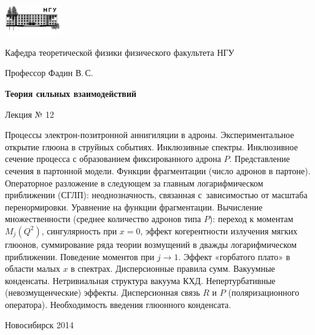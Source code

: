 \documentclass[12pt,pagesize,paper=192mm:108mm]{scrbook}
\begin{document}
\begin{titlepage}
  \vspace*{-1em}
  \begin{center}
    \includegraphics[width=0.18\textwidth]{../NSU-logo}

    Кафедра теоретической физики физического факультета НГУ

    \large
    Профессор Фадин В.\,С.
    \vspace{-0.5em}

    \huge
    \textbf{Теория сильных взаимодействий}
    
    \Large
    Лекция № 12
    \vfill
    
    \normalsize
    \begin{minipage}{0.93\linewidth}
    \footnotesize Процессы электрон-позитронной аннигиляции в
    адроны. Экспериментальное открытие глюона в струйных
    событиях. Инклюзивные спектры. Инклюзивное сечение процесса с
    образованием фиксированного адрона $P$. Представление сечения в
    партонной модели. Функции фрагментации (число адронов в
    партоне). Операторное разложение в следующем за главным
    логарифмическом приближении (СГЛП): неоднозначность, связанная 
    с~зависимостью от масштаба перенормировки. Уравнение на функции
    фрагментации. Вычисление множественности (среднее количество
    адронов типа $P$): переход к моментам $M_j(Q^2)$, сингулярность
    при $x=0$, эффект когерентности излучения мягких глюонов, суммирование
    ряда теории возмущений в дважды логарифмическом
    приближении. Поведение моментов при $j\to 1$. Эффект  «горбатого
    плато» в области малых $x$ в спектрах. Дисперсионные правила
    сумм. Вакуумные конденсаты. Нетривиальная структура вакуума
    КХД. Непертурбативные (невозмущенческие) эффекты. Дисперсионная
    связь $R$ и $P$ (поляризационного оператора). Необходимость введения
    глюонного конденсата. 
    \end{minipage}
    \vfill
    
    \normalsize \ccbysa\hspace{0.5em} Новосибирск 2014   
  \end{center}
\end{titlepage}
\end{document}
